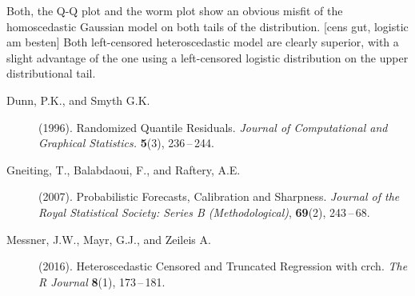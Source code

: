 \documentclass[twoside]{report}
\begin{document}
Both, the Q-Q plot and the worm plot show an obvious misfit of the 
homoscedastic Gaussian model on both tails of the distribution.
[cens gut, logistic am besten]
Both left-censored heteroscedastic model are clearly superior, with
a slight advantage of the one using a left-censored logistic distribution
on the upper distributional tail.








\begin{description}
    \item [Dunn, P.K., and Smyth G.K.] (1996).
        Randomized Quantile Residuals.
        {\it Journal of Computational and Graphical Statistics.}
        {\bf 5}(3), 236\,--\,244.
\item[Gneiting, T., Balabdaoui, F., and Raftery, A.E.] (2007).
    Probabilistic Forecasts, Calibration and Sharpness.
    {\it Journal of the Royal Statistical Society: Series B (Methodological)},
    {\bf 69}(2), 243\,--\,68.
\item [Messner, J.W., Mayr, G.J., and Zeileis A.] (2016).
    Heteroscedastic Censored and Truncated Regression with crch.
    {\it The R Journal}
    {\bf 8}(1), 173\,--\,181.
\end{description}
\end{document}
